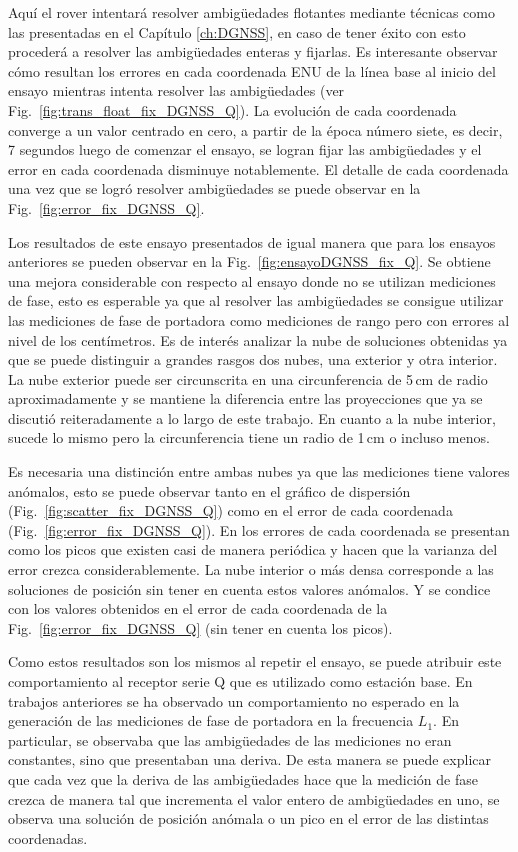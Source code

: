 \documentclass[a4paper,12pt,oneside,onecolumn,final,openright]{book}%
\begin{document}
	Aquí el rover intentará resolver ambigüedades flotantes mediante técnicas como las presentadas en el Capítulo \ref{ch:DGNSS}, en caso de tener éxito con esto procederá a resolver las ambigüedades enteras y fijarlas. Es interesante observar cómo resultan los errores en cada coordenada ENU de la línea base al inicio del ensayo mientras intenta resolver las ambigüedades (ver Fig.~\ref{fig:trans_float_fix_DGNSS_Q}). La evolución de cada coordenada converge a un valor centrado en cero, a partir de la época número siete, es decir, 7 segundos luego de comenzar el ensayo, se logran fijar las ambigüedades y el error en cada coordenada disminuye notablemente. El detalle de cada coordenada una vez que se logró resolver ambigüedades se puede observar en la Fig.~\ref{fig:error_fix_DGNSS_Q}.
		
	Los resultados de este ensayo presentados de igual manera que para los ensayos anteriores se pueden observar en la Fig.~\ref{fig:ensayoDGNSS_fix_Q}. Se obtiene una mejora considerable con respecto al ensayo donde no se utilizan mediciones de fase, esto es esperable ya que al resolver las ambigüedades se consigue utilizar las mediciones de fase de portadora como mediciones de rango pero con errores al nivel de los centímetros. Es de interés analizar la nube de soluciones obtenidas ya que se puede distinguir a grandes rasgos dos nubes, una exterior y otra interior. La nube exterior puede ser circunscrita en una circunferencia de 5\,cm de radio aproximadamente y se mantiene la diferencia entre las proyecciones que ya se discutió reiteradamente a lo largo de este trabajo. En cuanto a la nube interior, sucede lo mismo pero la circunferencia tiene un radio de 1\,cm o incluso menos. 
	
	Es necesaria una distinción entre ambas nubes ya que las mediciones tiene valores anómalos, esto se puede observar tanto en el gráfico de dispersión (Fig.~\ref{fig:scatter_fix_DGNSS_Q}) como en el error de cada coordenada (Fig.~\ref{fig:error_fix_DGNSS_Q}). En los errores de cada coordenada se presentan como los picos que existen casi de manera periódica y hacen que la varianza del error crezca considerablemente. La nube interior o más densa corresponde a las soluciones de posición sin tener en cuenta estos valores anómalos. Y se condice con los valores obtenidos en el error de cada coordenada de la Fig.~\ref{fig:error_fix_DGNSS_Q} (sin tener en cuenta los picos).
	
	Como estos resultados son los mismos al repetir el ensayo, se puede atribuir este comportamiento al receptor serie Q que es utilizado como estación base. En trabajos anteriores se ha observado un comportamiento no esperado en la generación de las mediciones de fase de portadora en la frecuencia $L_1$. En particular, se observaba que las ambigüedades de las mediciones no eran constantes, sino que presentaban una deriva. De esta manera se puede explicar que cada vez que la deriva de las ambigüedades hace que la medición de fase crezca de manera tal que incrementa el valor entero de ambigüedades en uno, se observa una solución de posición anómala o un pico en el error de las distintas coordenadas.
	 
\end{document}
